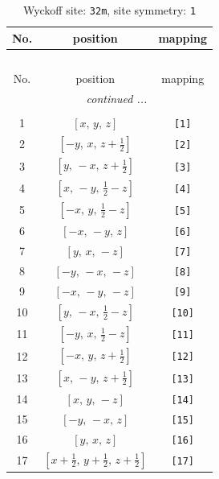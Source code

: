 \documentclass[fleqn,8pt]{jsarticle}
\begin{document}
\renewcommand{\arraystretch}{1.2}
\begin{longtable}{ccc}
\caption{Wyckoff site: {\tt 32m}, site symmetry: {\tt 1}}
 \\
 \hline \hline
No. & position & mapping \\ \hline \endfirsthead

\multicolumn{2}{l}{\tablename\ \thetable{}} \\
 \hline \hline
No. & position & mapping \\ \hline \endhead

 \hline \hline
\multicolumn{2}{r}{\footnotesize\it continued ...} \\ \endfoot

 \hline \hline
\multicolumn{2}{r}{} \\ \endlastfoot

1 & $\left[ x,\, y,\, z \right]$ & {\tt [1]} \\ \hline
2 & $\left[ - y,\, x,\, z + \frac{1}{2} \right]$ & {\tt [2]} \\ \hline
3 & $\left[ y,\, - x,\, z + \frac{1}{2} \right]$ & {\tt [3]} \\ \hline
4 & $\left[ x,\, - y,\, \frac{1}{2} - z \right]$ & {\tt [4]} \\ \hline
5 & $\left[ - x,\, y,\, \frac{1}{2} - z \right]$ & {\tt [5]} \\ \hline
6 & $\left[ - x,\, - y,\, z \right]$ & {\tt [6]} \\ \hline
7 & $\left[ y,\, x,\, - z \right]$ & {\tt [7]} \\ \hline
8 & $\left[ - y,\, - x,\, - z \right]$ & {\tt [8]} \\ \hline
9 & $\left[ - x,\, - y,\, - z \right]$ & {\tt [9]} \\ \hline
10 & $\left[ y,\, - x,\, \frac{1}{2} - z \right]$ & {\tt [10]} \\ \hline
11 & $\left[ - y,\, x,\, \frac{1}{2} - z \right]$ & {\tt [11]} \\ \hline
12 & $\left[ - x,\, y,\, z + \frac{1}{2} \right]$ & {\tt [12]} \\ \hline
13 & $\left[ x,\, - y,\, z + \frac{1}{2} \right]$ & {\tt [13]} \\ \hline
14 & $\left[ x,\, y,\, - z \right]$ & {\tt [14]} \\ \hline
15 & $\left[ - y,\, - x,\, z \right]$ & {\tt [15]} \\ \hline
16 & $\left[ y,\, x,\, z \right]$ & {\tt [16]} \\ \hline
17 & $\left[ x + \frac{1}{2},\, y + \frac{1}{2},\, z + \frac{1}{2} \right]$ & {\tt [17]} \\ \hline

\end{longtable}
\end{document}
